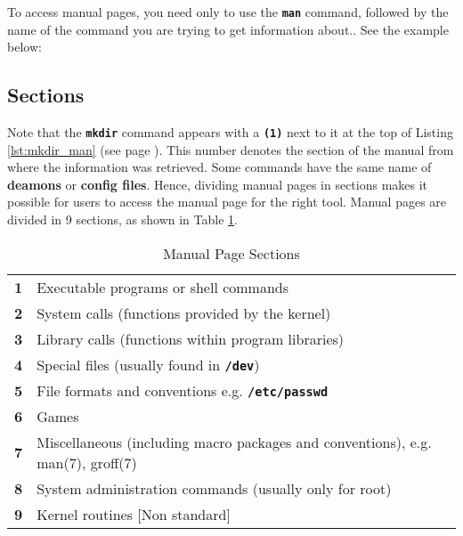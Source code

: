 To access manual pages, you need only to use the \textbf{\texttt{man}} command, followed by the name of the command you are trying to get information about.. See the example below:


\subsection{Sections}

Note that the \textbf{\texttt{mkdir}} command appears with a \textbf{\texttt{(1)}} next to it at the top of Listing \ref{lst:mkdir_man} (see page  \pageref{lst:mkdir_man}). This number denotes the section of the manual from where the information was retrieved. Some commands have the same name of \textbf{deamons} or \textbf{config files}. Hence, dividing manual pages in sections makes it possible for users to access the manual page for the right tool. Manual pages are divided in 9 sections, as shown in Table \ref{tab:man_sections}.

\begin{table}[!htbp]
   \myfloatalign
   \begin{tabularx}{\textwidth}{Xp{105mm}} \toprule
   \textbf{1} & Executable programs or shell commands \\
    \textbf{2} & System calls (functions provided by the kernel) \\
   \textbf{3} & Library calls (functions within program libraries) \\
   \textbf{4} & Special files (usually found in \textbf{\texttt{/dev}})\\
   \textbf{5} & File formats and conventions e.g. \textbf{\texttt{/etc/passwd}}\\
   \textbf{6} & Games\\
   \textbf{7} & Miscellaneous (including macro packages and conventions), e.g. man(7), groff(7) \\
   \textbf{8} & System administration commands (usually only for root)\\
   \textbf{9} & Kernel routines [Non standard] \\
   \bottomrule
   \end{tabularx}
\caption{Manual Page Sections}
\label{tab:man_sections}
\end{table}

